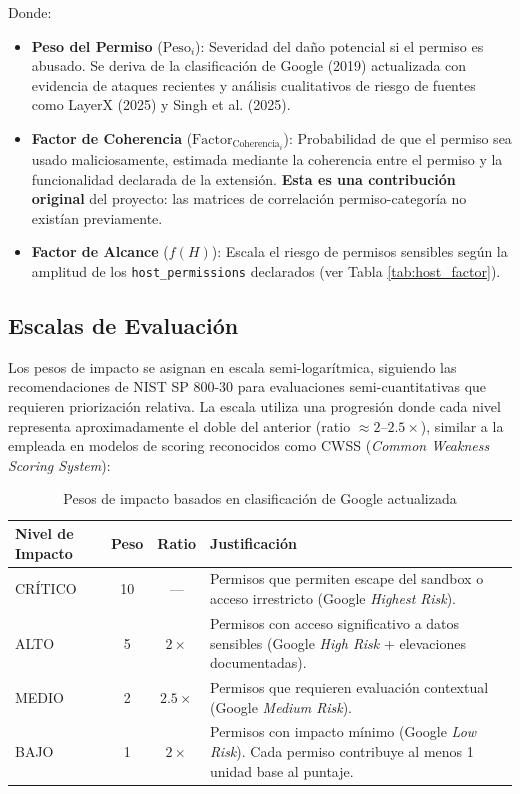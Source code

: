 \documentclass[12pt,oneside]{report}
\begin{document}
Donde:
\begin{itemize}
    \item \textbf{Peso del Permiso} ($\text{Peso}_i$): Severidad del daño potencial si el permiso es abusado. Se deriva de la clasificación de Google (2019) actualizada con evidencia de ataques recientes y análisis cualitativos de riesgo de fuentes como LayerX (2025) y Singh et al. (2025).
    \item \textbf{Factor de Coherencia} ($\text{Factor}_{\text{Coherencia}_i}$): Probabilidad de que el permiso sea usado maliciosamente, estimada mediante la coherencia entre el permiso y la funcionalidad declarada de la extensión. \textbf{Esta es una contribución original} del proyecto: las matrices de correlación permiso-categoría no existían previamente.
    \item \textbf{Factor de Alcance} ($f(H)$): Escala el riesgo de permisos sensibles según la amplitud de los \texttt{host\_permissions} declarados (ver Tabla \ref{tab:host_factor}).
\end{itemize}

\subsection{Escalas de Evaluación}

Los pesos de impacto se asignan en escala semi-logarítmica, siguiendo las recomendaciones de NIST SP 800-30 para evaluaciones semi-cuantitativas que requieren priorización relativa. La escala utiliza una progresión donde cada nivel representa aproximadamente el doble del anterior (ratio $\approx 2\text{--}2.5\times$), similar a la empleada en modelos de scoring reconocidos como CWSS (\textit{Common Weakness Scoring System}):

\begin{table}[!htbp]
\centering
\begin{tabular}{|l|c|c|p{6cm}|}
\hline
\textbf{Nivel de Impacto} & \textbf{Peso} & \textbf{Ratio} & \textbf{Justificación} \\
\hline
CRÍTICO & 10 & --- & Permisos que permiten escape del sandbox o acceso irrestricto (Google \textit{Highest Risk}). \\
ALTO & 5 & $2\times$ & Permisos con acceso significativo a datos sensibles (Google \textit{High Risk} + elevaciones documentadas). \\
MEDIO & 2 & $2.5\times$ & Permisos que requieren evaluación contextual (Google \textit{Medium Risk}). \\
BAJO & 1 & $2\times$ & Permisos con impacto mínimo (Google \textit{Low Risk}). Cada permiso contribuye al menos 1 unidad base al puntaje. \\
\hline
\end{tabular}
\caption{Pesos de impacto basados en clasificación de Google actualizada}
\label{tab:impact_weights}
\end{table}
\end{document}
